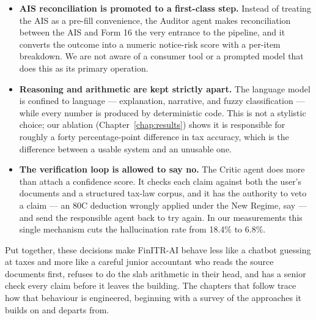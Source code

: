\begin{itemize}
    \item \textbf{AIS reconciliation is promoted to a first-class step.}
          Instead of treating the AIS as a pre-fill convenience, the Auditor
          agent makes reconciliation between the AIS and Form 16 the very
          entrance to the pipeline, and it converts the outcome into a numeric
          notice-risk score with a per-item breakdown. We are not aware of a
          consumer tool or a prompted model that does this as its primary
          operation.
    \item \textbf{Reasoning and arithmetic are kept strictly apart.} The
          language model is confined to language --- explanation, narrative, and
          fuzzy classification --- while every number is produced by
          deterministic code. This is not a stylistic choice; our ablation
          (Chapter~\ref{chap:results}) shows it is responsible for roughly a
          forty percentage-point difference in tax accuracy, which is the
          difference between a usable system and an unusable one.
    \item \textbf{The verification loop is allowed to say no.} The Critic agent
          does more than attach a confidence score. It checks each claim against
          both the user's documents and a structured tax-law corpus, and it has
          the authority to veto a claim --- an 80C deduction wrongly applied
          under the New Regime, say --- and send the responsible agent back to
          try again. In our measurements this single mechanism cuts the
          hallucination rate from 18.4\% to 6.8\%.
\end{itemize}

Put together, these decisions make FinITR-AI behave less like a chatbot
guessing at taxes and more like a careful junior accountant who reads the source
documents first, refuses to do the slab arithmetic in their head, and has a
senior check every claim before it leaves the building. The chapters that follow
trace how that behaviour is engineered, beginning with a survey of the
approaches it builds on and departs from.
